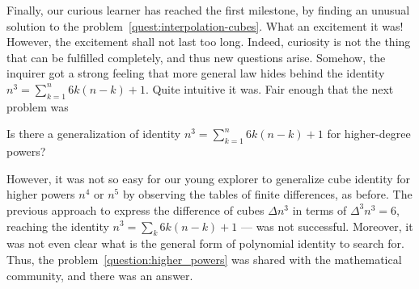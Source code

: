 Finally, our curious learner has reached the first milestone, by finding an
unusual solution to the problem~\eqref{quest:interpolation-cubes}.
What an excitement it was!
However, the excitement shall not last too long.
Indeed, curiosity is not the thing that can be fulfilled completely,
and thus new questions arise.
Somehow, the inquirer got a strong feeling that more general
law hides behind the identity $n^3 = \sum_{k=1}^{n} 6k(n-k) + 1$.
Quite intuitive it was.
Fair enough that the next problem was
\begin{problem}
    Is there a generalization of identity $n^3 = \sum_{k=1}^{n} 6k(n-k) + 1$ for higher-degree powers?
    \label{question:higher_powers}
\end{problem}

However, it was not so easy for our young explorer to generalize cube identity for higher powers $n^4$ or $n^5$
by observing the tables of finite differences, as before.
The previous approach to express the difference of cubes $\Delta n^3$ in terms of
$\Delta^3 n^3 = 6$, reaching the identity $n^3 = \sum_k 6k (n-k) +1$ --- was not successful.
Moreover, it was not even clear what is the general form of polynomial identity to search for.
Thus, the problem~\eqref{question:higher_powers} was shared with the mathematical community,
and there was an answer.
